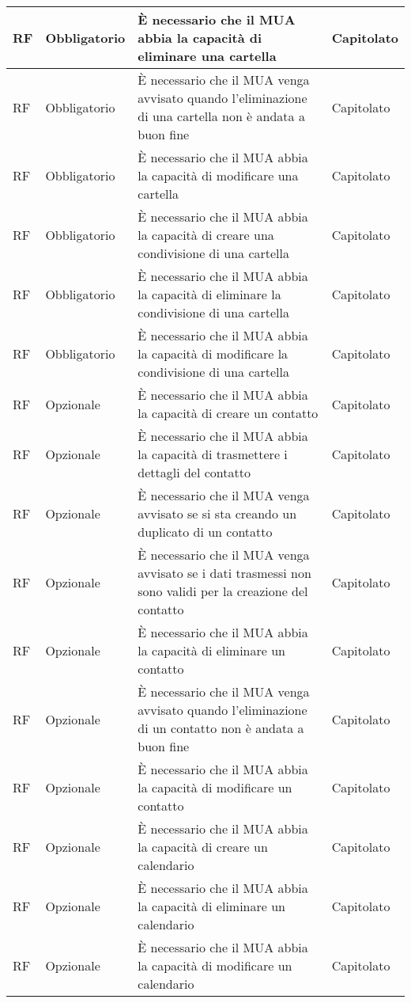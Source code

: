 \begin{longtable}{*{1}{>{\centering\arraybackslash}p{1.5cm}}*{1}{>{\centering\arraybackslash}p{2.5cm}}p{6cm}*{1}{>{\centering\arraybackslash}p{3cm}}}
    RF & Obbligatorio & È necessario che il MUA abbia la capacità di eliminare una cartella & Capitolato
    \\\hline 
    RF & Obbligatorio & È necessario che il MUA venga avvisato quando l'eliminazione di una cartella non è andata a buon fine & Capitolato
    \\\hline
    RF & Obbligatorio & È necessario che il MUA abbia la capacità di modificare una cartella & Capitolato
    \\\hline 
    RF & Obbligatorio & È necessario che il MUA abbia la capacità di creare una condivisione di una cartella & Capitolato
    \\\hline 
    RF & Obbligatorio & È necessario che il MUA abbia la capacità di eliminare la condivisione di una cartella & Capitolato
    \\\hline
    RF & Obbligatorio & È necessario che il MUA abbia la capacità di modificare la condivisione di una cartella & Capitolato
    \\\hline
    RF & Opzionale & È necessario che il MUA abbia la capacità di creare un contatto & Capitolato
    \\\hline
    RF & Opzionale & È necessario che il MUA abbia la capacità di trasmettere i dettagli del contatto & Capitolato
    \\\hline 
    RF & Opzionale & È necessario che il MUA venga avvisato se si sta creando un duplicato di un contatto & Capitolato
    \\\hline 
    RF & Opzionale & È necessario che il MUA venga avvisato se i dati trasmessi non sono validi per la creazione del contatto & Capitolato
    \\\hline
    RF & Opzionale & È necessario che il MUA abbia la capacità di eliminare un contatto & Capitolato
    \\\hline
    RF & Opzionale & È necessario che il MUA venga avvisato quando l'eliminazione di un contatto non è andata a buon fine & Capitolato
    \\\hline
    RF & Opzionale & È necessario che il MUA abbia la capacità di modificare un contatto & Capitolato
    \\\hline 
    RF & Opzionale & È necessario che il MUA abbia la capacità di creare un calendario & Capitolato
    \\\hline
    RF & Opzionale & È necessario che il MUA abbia la capacità di eliminare un calendario & Capitolato
    \\\hline
    RF & Opzionale & È necessario che il MUA abbia la capacità di modificare un calendario & Capitolato

\end{longtable}
